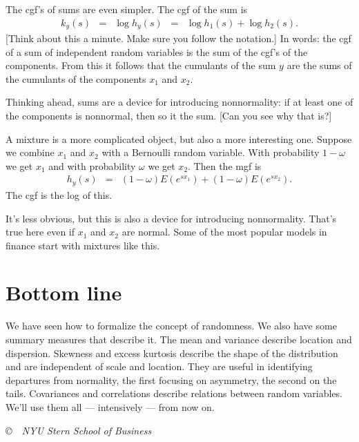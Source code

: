 \documentclass[11pt]{article}
\begin{document}
The cgf's of sums are even simpler.  
The cgf of the sum is 
\begin{eqnarray*}
    k_y(s) &=& \log h_y(s) 
            \;\;=\;\; \log h_1(s) + \log h_2(s) .
\end{eqnarray*}
[Think about this a minute.  Make sure you follow the notation.]
In words: the cgf of a sum of independent random variables
is the sum of the cgf's of the components.  
From this it follows that the cumulants of the sum $y$
are the sums of the cumulants of the components $x_1$ and $x_2$.  

Thinking ahead, sums are a device for introducing nonnormality:
if at least one of the components is nonnormal, 
then so it the sum.  
[Can you see why that is?] 


A mixture is a more complicated object, 
but also a more interesting one. 
Suppose we combine $x_1$ and $x_2$ with a Bernoulli random variable.
With probability $1-\omega$ we get $x_1$
and with probability $\omega$ we get $x_2$. 
Then the mgf is 
\begin{eqnarray*}
    h_y(s) &=& (1-\omega) E \left( e^{sx_1} \right)
            + (1-\omega) E \left( e^{sx_2} \right) .
\end{eqnarray*}
The cgf is the log of this.  

It's less obvious, but this is also a device for introducing nonnormality.
That's true here even if $x_1$ and $x_2$ are normal. 
Some of the most popular models in finance start with mixtures like this.  


\section*{Bottom line}

We have seen how to formalize the concept of randomness.
We also have some summary measures that describe it.
The mean and variance describe location and dispersion.
Skewness and excess kurtosis describe the shape of the distribution
and are independent of scale and location.
They are useful in identifying departures from normality,
the first focusing on asymmetry, the second on the tails.
Covariances and correlations describe
relations between random variables.
We'll use them all --- intensively --- from now on.


\vfill \centerline{\it \copyright \ \number\year \
NYU Stern School of Business}
\end{document}
